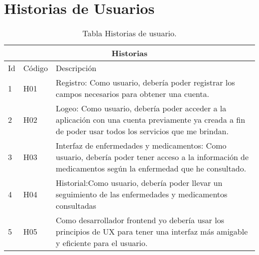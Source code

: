 \chapter{Historias de Usuarios}


\begin{table}[htb]
	\centering
	\begin{tabular}{|l|p{1.5cm}|p{10cm}|}
		\hline
		\multicolumn{3}{|c|}{Historias} \\ \hline
		Id & Código & Descripción \\
		\hline \hline
		1 & H01  & Registro: Como usuario, debería poder registrar los campos necesarios para obtener una cuenta.\\ \hline
		
		2 & H02  & Logeo: Como usuario, debería poder acceder a la aplicación con una cuenta previamente ya creada a fin de poder usar todos los servicios que me brindan.  \\ \hline
		
		3 & H03 & Interfaz de enfermedades y medicamentos: 
		Como usuario, debería poder tener acceso a la información de medicamentos según la enfermedad que he consultado.   \\ \hline
		
		4 & H04  & Historial:Como usuario, debería poder llevar un seguimiento de las enfermedades y medicamentos consultadas \\ \hline
		
		5 & H05  & Como desarrollador frontend yo debería usar los 
		principios de UX para tener una interfaz más amigable 
		y eficiente para el usuario. 
		 \\ \hline
		
	
	\end{tabular}
	\caption{Tabla Historias de usuario.}
	\label{tabla:Historial}
\end{table}